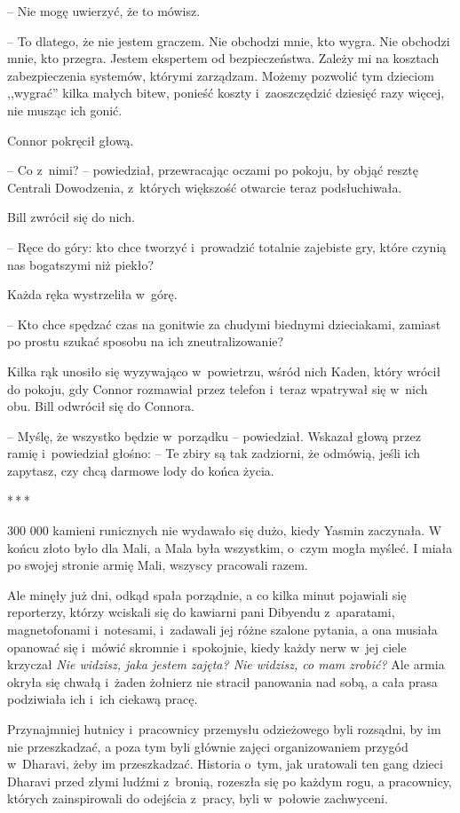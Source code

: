 \documentclass[oneside,polish,11pt,rmheadings]{mwbk}
\newcommand{\threeast}{\par\centerline{*\,*\,*}\medskip\par}
\begin{document}
-- Nie mogę uwierzyć, że to mówisz.

-- To dlatego, że nie jestem graczem. Nie obchodzi mnie, kto wygra. Nie obchodzi mnie, kto przegra. Jestem ekspertem od bezpieczeństwa. Zależy mi na kosztach zabezpieczenia systemów, którymi zarządzam. Możemy pozwolić tym dzieciom ,,wygrać'' kilka małych bitew, ponieść koszty i~zaoszczędzić dziesięć razy więcej, nie musząc ich gonić.

Connor pokręcił głową. 

-- Co z~nimi? -- powiedział, przewracając oczami po pokoju, by objąć resztę Centrali Dowodzenia, z~których większość otwarcie teraz podsłuchiwała.

Bill zwrócił się do nich. 

-- Ręce do góry: kto chce tworzyć i~prowadzić totalnie zajebiste gry, które czynią nas bogatszymi niż piekło? 

 Każda ręka wystrzeliła w~górę. 
 
 -- Kto chce spędzać czas na gonitwie za chudymi biednymi dzieciakami, zamiast po prostu szukać sposobu na ich zneutralizowanie? 
 
 Kilka rąk unosiło się wyzywająco w~powietrzu, wśród nich Kaden, który wrócił do pokoju, gdy Connor rozmawiał przez telefon i~teraz wpatrywał się w~nich obu. Bill odwrócił się do Connora.
 
-- Myślę, że wszystko będzie w~porządku -- powiedział. Wskazał głową przez ramię i~powiedział głośno: -- Te zbiry są tak zadziorni, że odmówią, jeśli ich zapytasz, czy chcą darmowe lody do końca życia.

\bigskip
\threeast

300 000 kamieni runicznych nie wydawało się dużo, kiedy Yasmin zaczynała. W końcu złoto było dla Mali, a Mala była wszystkim, o~czym mogła myśleć. I miała po swojej stronie armię Mali, wszyscy pracowali razem.

Ale minęły już dni, odkąd spała porządnie, a co kilka minut pojawiali się reporterzy, którzy wciskali się do kawiarni pani Dibyendu z~aparatami, magnetofonami i~notesami, i~zadawali jej różne szalone pytania, a ona musiała opanować się i~mówić skromnie i~spokojnie, kiedy każdy nerw w~jej ciele krzyczał \textit{Nie widzisz, jaka jestem zajęta? Nie widzisz, co mam zrobić? }Ale armia okryła się chwałą i~żaden żołnierz nie stracił panowania nad sobą, a cała prasa podziwiała ich i~ich ciekawą pracę.

Przynajmniej hutnicy i~pracownicy przemysłu odzieżowego byli rozsądni, by im nie przeszkadzać, a poza tym byli głównie zajęci organizowaniem przygód w~Dharavi, żeby im przeszkadzać. Historia o~tym, jak uratowali ten gang dzieci Dharavi przed złymi ludźmi z~bronią, rozeszła się po każdym rogu, a pracownicy, których zainspirowali do odejścia z~pracy, byli w~połowie zachwyceni.
\end{document}
